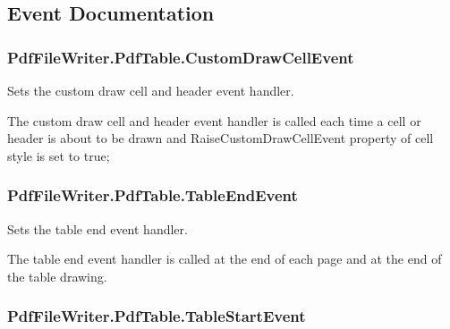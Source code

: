 \subsection{Event Documentation}
\subsubsection[{\texorpdfstring{Custom\+Draw\+Cell\+Event}{CustomDrawCellEvent}}]{ Pdf\+File\+Writer.\+Pdf\+Table.\+Custom\+Draw\+Cell\+Event}\hypertarget{class_pdf_file_writer_1_1_pdf_table_a7a2051f74af56a391ed906abbac27899}{}\label{class_pdf_file_writer_1_1_pdf_table_a7a2051f74af56a391ed906abbac27899}


Sets the custom draw cell and header event handler. 

The custom draw cell and header event handler is called each time a cell or header is about to be drawn and Raise\+Custom\+Draw\+Cell\+Event property of cell style is set to true; 
\subsubsection[{\texorpdfstring{Table\+End\+Event}{TableEndEvent}}]{ Pdf\+File\+Writer.\+Pdf\+Table.\+Table\+End\+Event}\hypertarget{class_pdf_file_writer_1_1_pdf_table_a4d018de1d01794181a6cdd138c9c89cf}{}\label{class_pdf_file_writer_1_1_pdf_table_a4d018de1d01794181a6cdd138c9c89cf}


Sets the table end event handler. 

The table end event handler is called at the end of each page and at the end of the table drawing. 
\subsubsection[{\texorpdfstring{Table\+Start\+Event}{TableStartEvent}}]{ Pdf\+File\+Writer.\+Pdf\+Table.\+Table\+Start\+Event}\hypertarget{class_pdf_file_writer_1_1_pdf_table_a2b57e4a00adfd202b410c182fb7fd3a5}{}\label{class_pdf_file_writer_1_1_pdf_table_a2b57e4a00adfd202b410c182fb7fd3a5}


